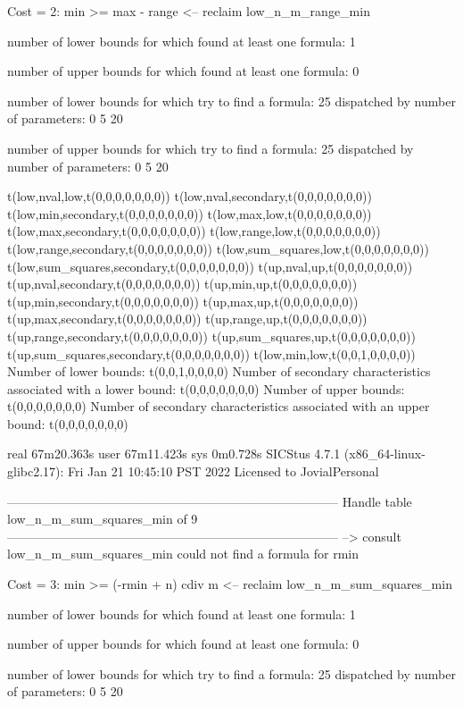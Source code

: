 Cost =  2:  min >= max - range
<-- reclaim low_n_m_range_min

number of lower bounds for which found at least one formula: 1

number of upper bounds for which found at least one formula: 0

number of lower bounds for which try to find a formula: 25
dispatched by number of parameters: 0  5  20

number of upper bounds for which try to find a formula: 25
dispatched by number of parameters: 0  5  20

t(low,nval,low,t(0,0,0,0,0,0,0))
t(low,nval,secondary,t(0,0,0,0,0,0,0))
t(low,min,secondary,t(0,0,0,0,0,0,0))
t(low,max,low,t(0,0,0,0,0,0,0))
t(low,max,secondary,t(0,0,0,0,0,0,0))
t(low,range,low,t(0,0,0,0,0,0,0))
t(low,range,secondary,t(0,0,0,0,0,0,0))
t(low,sum_squares,low,t(0,0,0,0,0,0,0))
t(low,sum_squares,secondary,t(0,0,0,0,0,0,0))
t(up,nval,up,t(0,0,0,0,0,0,0))
t(up,nval,secondary,t(0,0,0,0,0,0,0))
t(up,min,up,t(0,0,0,0,0,0,0))
t(up,min,secondary,t(0,0,0,0,0,0,0))
t(up,max,up,t(0,0,0,0,0,0,0))
t(up,max,secondary,t(0,0,0,0,0,0,0))
t(up,range,up,t(0,0,0,0,0,0,0))
t(up,range,secondary,t(0,0,0,0,0,0,0))
t(up,sum_squares,up,t(0,0,0,0,0,0,0))
t(up,sum_squares,secondary,t(0,0,0,0,0,0,0))
t(low,min,low,t(0,0,1,0,0,0,0))
Number of lower bounds:                                             t(0,0,1,0,0,0,0)
Number of secondary characteristics associated with a lower bound:  t(0,0,0,0,0,0,0)
Number of upper bounds:                                             t(0,0,0,0,0,0,0)
Number of secondary characteristics associated with an upper bound: t(0,0,0,0,0,0,0)

real	67m20.363s
user	67m11.423s
sys	0m0.728s
SICStus 4.7.1 (x86_64-linux-glibc2.17): Fri Jan 21 10:45:10 PST 2022
Licensed to JovialPersonal


--------------------------------------------------------------------------------
Handle table low_n_m_sum_squares_min of 9
--------------------------------------------------------------------------------
--> consult low_n_m_sum_squares_min
could not find a formula for rmin

Cost =  3:  min >= (-rmin + n) cdiv m
<-- reclaim low_n_m_sum_squares_min

number of lower bounds for which found at least one formula: 1

number of upper bounds for which found at least one formula: 0

number of lower bounds for which try to find a formula: 25
dispatched by number of parameters: 0  5  20


